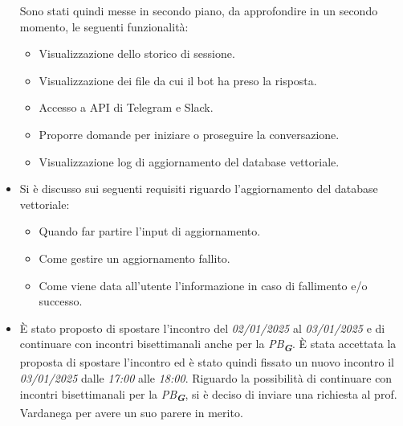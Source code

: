 \begin{itemize}
    Sono stati quindi messe in secondo piano, da approfondire in un secondo momento, le seguenti funzionalità:
    \begin{itemize}
        \item Visualizzazione dello storico di sessione.
        \item Visualizzazione dei file da cui il bot ha preso la risposta.
        \item Accesso a API di Telegram e Slack.
        \item Proporre domande per iniziare o proseguire la conversazione.
        \item Visualizzazione log di aggiornamento del database vettoriale.
    \end{itemize}
    \item Si è discusso sui seguenti requisiti riguardo l'aggiornamento del database vettoriale:
    \begin{itemize}
        \item Quando far partire l'input di aggiornamento.
        \item Come gestire un aggiornamento fallito.
        \item Come viene data all'utente l'informazione in caso di fallimento e/o successo.
    \end{itemize}
    \item È stato proposto di spostare l'incontro del \emph{02/01/2025} al \emph{03/01/2025} e di continuare con incontri bisettimanali anche per la \emph{PB}\textsubscript{\textbf{\textit{G}}}.
    È stata accettata la proposta di spostare l'incontro ed è stato quindi fissato un nuovo incontro il \emph{03/01/2025} dalle \emph{17:00} alle \emph{18:00}.
    Riguardo la possibilità di continuare con incontri bisettimanali per la \emph{PB}\textsubscript{\textbf{\textit{G}}}, si è deciso di inviare una richiesta al prof. Vardanega per avere un suo parere in merito.
\end{itemize}